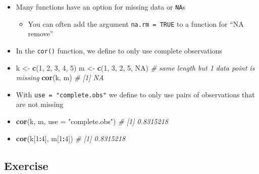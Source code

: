 \documentclass[
]{book}
\newenvironment{Shaded}{\begin{snugshade}}{\end{snugshade}}
\newcommand{\AttributeTok}[1]{\textcolor[rgb]{0.13,0.29,0.53}{#1}}
\newcommand{\CommentTok}[1]{\textcolor[rgb]{0.56,0.35,0.01}{\textit{#1}}}
\newcommand{\ConstantTok}[1]{\textcolor[rgb]{0.56,0.35,0.01}{#1}}
\newcommand{\DecValTok}[1]{\textcolor[rgb]{0.00,0.00,0.81}{#1}}
\newcommand{\FunctionTok}[1]{\textcolor[rgb]{0.13,0.29,0.53}{\textbf{#1}}}
\newcommand{\NormalTok}[1]{#1}
\newcommand{\OtherTok}[1]{\textcolor[rgb]{0.56,0.35,0.01}{#1}}
\newcommand{\SpecialCharTok}[1]{\textcolor[rgb]{0.81,0.36,0.00}{\textbf{#1}}}
\newcommand{\StringTok}[1]{\textcolor[rgb]{0.31,0.60,0.02}{#1}}
\providecommand{\tightlist}{%
  \setlength{\itemsep}{0pt}\setlength{\parskip}{0pt}}
\begin{document}
\begin{itemize}
\item
  Many functions have an option for missing data or \texttt{NA}s

  \begin{itemize}
  \tightlist
  \item
    You can often add the argument \texttt{na.rm\ =\ TRUE} to a function for ``NA remove''
  \end{itemize}
\item
  In the \texttt{cor()} function, we define to only use complete observations
\item
\begin{Shaded}
\begin{Highlighting}[]
\NormalTok{k }\OtherTok{\textless{}{-}} \FunctionTok{c}\NormalTok{(}\DecValTok{1}\NormalTok{, }\DecValTok{2}\NormalTok{, }\DecValTok{3}\NormalTok{, }\DecValTok{4}\NormalTok{, }\DecValTok{5}\NormalTok{)}
\NormalTok{m }\OtherTok{\textless{}{-}} \FunctionTok{c}\NormalTok{(}\DecValTok{1}\NormalTok{, }\DecValTok{3}\NormalTok{, }\DecValTok{2}\NormalTok{, }\DecValTok{5}\NormalTok{, }\ConstantTok{NA}\NormalTok{) }\CommentTok{\# same length but 1 data point is missing}
\FunctionTok{cor}\NormalTok{(k, m)}
\CommentTok{\# [1] NA}
\end{Highlighting}
\end{Shaded}
\item
  With \texttt{use\ =\ "complete.obs"} we define to only use pairs of observations that are not missing
\item
\begin{Shaded}
\begin{Highlighting}[]
\FunctionTok{cor}\NormalTok{(k, m, }\AttributeTok{use =} \StringTok{"complete.obs"}\NormalTok{)}
\CommentTok{\# [1] 0.8315218}
\end{Highlighting}
\end{Shaded}
\item
\begin{Shaded}
\begin{Highlighting}[]
\FunctionTok{cor}\NormalTok{(k[}\DecValTok{1}\SpecialCharTok{:}\DecValTok{4}\NormalTok{], m[}\DecValTok{1}\SpecialCharTok{:}\DecValTok{4}\NormalTok{])}
\CommentTok{\# [1] 0.8315218}
\end{Highlighting}
\end{Shaded}
\end{itemize}

\subsection{Exercise}\label{exercise-6}
\end{document}
